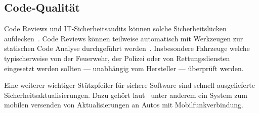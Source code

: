 \subsection{Code-Qualität}
Code Reviews und IT-Sicherheits\-audits können solche Sicherheits\-lücken
aufdecken~\cite{Howard2006}. Code Reviews können teilweise automatisch mit
Werkzeugen zur statischen Code Analyse durchgeführt werden~\cite{McGraw2008}.
Insbesondere Fahrzeuge welche typischerweise von der Feuerwehr, der Polizei
oder von Rettungsdiensten eingesetzt werden sollten --- unabhängig vom Hersteller
--- überprüft werden.

Eine weiterer wichtiger Stützpfeiler für sichere Software sind schnell
ausgelieferte Sicherheits\-aktualisierungen. Dazu gehört
laut~\cite{Mahaffey2015} unter anderem ein System zum mobilen versenden von
Aktualisierungen an Autos mit Mobilfunk\-verbindung.
